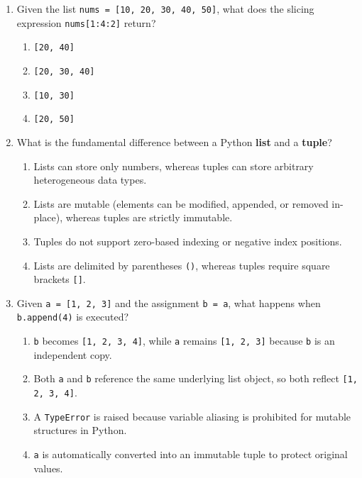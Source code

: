 \documentclass[11pt,a4paper]{article}
\begin{document}
\begin{enumerate}[label=\textbf{Q\arabic*.},leftmargin=2em,itemsep=1.5pt,topsep=1pt]

\item Given the list \texttt{nums = [10, 20, 30, 40, 50]}, what does the slicing expression \texttt{nums[1:4:2]} return?
\begin{enumerate}[label=\Alph*.,leftmargin=2em]
  \item \texttt{[20, 40]}
  \item \texttt{[20, 30, 40]}
  \item \texttt{[10, 30]}
  \item \texttt{[20, 50]}
\end{enumerate}

\item What is the fundamental difference between a Python \textbf{list} and a \textbf{tuple}?
\begin{enumerate}[label=\Alph*.,leftmargin=2em]
  \item Lists can store only numbers, whereas tuples can store arbitrary heterogeneous data types.
  \item Lists are mutable (elements can be modified, appended, or removed in-place), whereas tuples are strictly immutable.
  \item Tuples do not support zero-based indexing or negative index positions.
  \item Lists are delimited by parentheses \texttt{()}, whereas tuples require square brackets \texttt{[]}.
\end{enumerate}

\item Given \texttt{a = [1, 2, 3]} and the assignment \texttt{b = a}, what happens when \texttt{b.append(4)} is executed?
\begin{enumerate}[label=\Alph*.,leftmargin=2em]
  \item \texttt{b} becomes \texttt{[1, 2, 3, 4]}, while \texttt{a} remains \texttt{[1, 2, 3]} because \texttt{b} is an independent copy.
  \item Both \texttt{a} and \texttt{b} reference the same underlying list object, so both reflect \texttt{[1, 2, 3, 4]}.
  \item A \texttt{TypeError} is raised because variable aliasing is prohibited for mutable structures in Python.
  \item \texttt{a} is automatically converted into an immutable tuple to protect original values.
\end{enumerate}


\end{enumerate}
\end{document}
